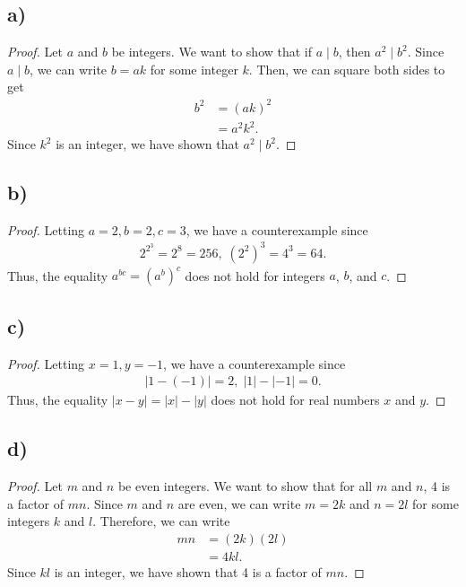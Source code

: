 \documentclass{article}
\begin{document}
\subsection*{a)}
\begin{proof}
    Let $a$ and $b$ be integers.
    We want to show that if $a \mid b$, then $a^2 \mid b^2$.
    Since $a \mid b$, we can write $b = ak$ for some integer $k$.
    Then, we can square both sides to get
    \begin{align*}
        b^2 &= (ak)^2 \\
        &= a^2k^2.
    \end{align*}
    Since $k^2$ is an integer, we have shown that $a^2 \mid b^2$.
\end{proof}

\subsection*{b)}
\renewcommand*{\proofname}{Disproof}
\begin{proof}
    Letting $a = 2, b = 2, c = 3$, we have a counterexample since
    \begin{align*}
        2^{2^3} = 2^8 = 256, \; (2^2)^3 = 4^3 = 64.
    \end{align*}
    Thus, the equality $a^{bc} = (a^b)^c$ does not hold for integers $a$, $b$, and $c$.
\end{proof}

\subsection*{c)}
\begin{proof}
    Letting $x = 1, y = -1$, we have a counterexample since
    \begin{align*}
        | 1 - (-1) | = 2, \; |1| - |-1| = 0.
    \end{align*}
    Thus, the equality $|x - y| = |x| - |y|$ does not hold for real numbers $x$ and $y$.
\end{proof}

\subsection*{d)}
\renewcommand*{\proofname}{Proof}
\begin{proof}
    Let $m$ and $n$ be even integers.
    We want to show that for all $m$ and $n$, 4 is a factor of $mn$.
    Since $m$ and $n$ are even, we can write $m = 2k$ and $n = 2l$ for some integers $k$ and $l$.
    Therefore, we can write
    \begin{align*}
        mn &= (2k)(2l) \\
        &= 4kl.
    \end{align*}
    Since $kl$ is an integer, we have shown that 4 is a factor of $mn$.
\end{proof}
\end{document}
